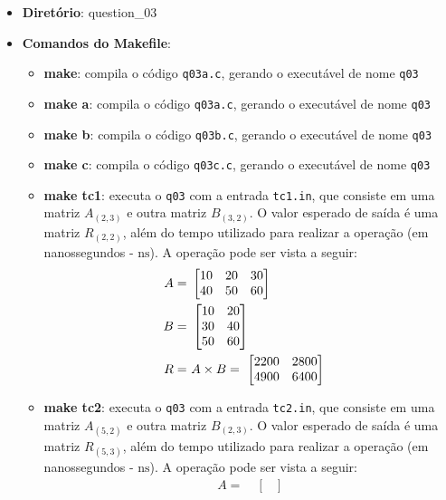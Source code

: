 \begin{itemize}
	\item{\textbf{Diretório}: question\_03}
	\item{\textbf{Comandos do Makefile}:
	\begin{itemize}
		\item{\textbf{make}: compila o código \texttt{q03a.c}, gerando o executável de nome \texttt{q03}}
		\item{\textbf{make a}: compila o código \texttt{q03a.c}, gerando o executável de nome \texttt{q03}}
		\item{\textbf{make b}: compila o código \texttt{q03b.c}, gerando o executável de nome \texttt{q03}}
		\item{\textbf{make c}: compila o código \texttt{q03c.c}, gerando o executável de nome \texttt{q03}}
		\item{\textbf{make tc1}: executa o \texttt{q03} com a entrada \texttt{tc1.in}, que consiste em uma matriz $A_{(2,3)}$ e outra matriz $B_{(3,2)}$. O valor esperado de saída é uma matriz $R_{(2,2)}$, além do tempo utilizado para realizar a operação (em nanossegundos - $\text{ns}$). A operação pode ser vista a seguir:
		\begin{align}
			A = \ &
			\begin{bmatrix}
				10 & 20 & 30 \\
				40 & 50 & 60
			\end{bmatrix}
			& \notag \\
			B = \ &
			\begin{bmatrix}
				10 & 20 \\
				30 & 40 \\
				50 & 60
			\end{bmatrix}
			& \notag \\
			R = \ & A \times B = \
			\begin{bmatrix}
				2200 & 2800 \\
				4900 & 6400
			\end{bmatrix}
			& \label{eq:q03_tc1}
		\end{align}
		}
		\item{\textbf{make tc2}: executa o \texttt{q03} com a entrada \texttt{tc2.in}, que consiste em uma matriz $A_{(5,2)}$ e outra matriz $B_{(2,3)}$. O valor esperado de saída é uma matriz $R_{(5,3)}$, além do tempo utilizado para realizar a operação (em nanossegundos - $\text{ns}$). A operação pode ser vista a seguir:
		\begin{align}
			A = \ &
			\begin{bmatrix}

\end{bmatrix}
\end{align}}
\end{itemize}}
\end{itemize}
